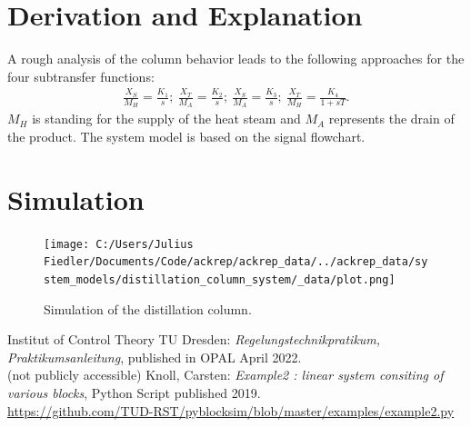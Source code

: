 \documentclass[10pt,a4paper]{article}
\begin{document}
	
	\section{Derivation and Explanation} %
	A rough analysis of the column behavior leads to the following approaches for the four subtransfer functions:
	\begin{align*}
		\frac{X_S}{M_H} = \frac{K_1}{s};\ \frac{X_T}{M_A} = \frac{K_2}{s};\ \frac{X_S}{M_A} = \frac{K_3}{s};\ \frac{X_T}{M_H} = \frac{K_4}{1 + sT}.
	\end{align*}
	$M_H$ is standing for the supply of the heat steam and $M_A$ represents the drain of the product. The system model is based on the signal flowchart.
	
	

\section{Simulation}
\begin{figure}[H]
\centering
\texttt{[image: C:/Users/Julius Fiedler/Documents/Code/ackrep/ackrep\_data/../ackrep\_data/system\_models/distillation\_column\_system/\_data/plot.png]}
\caption{Simulation of the distillation column.}
\end{figure}
	\begin{thebibliography}{10}		
		Institut of Control Theory TU Dresden: \textit{Regelungstechnikpratikum, Praktikumsanleitung}, published in OPAL April 2022. \\
		(not publicly accessible)
		Knoll, Carsten: \textit{Example2 : linear system consiting of various blocks}, Python Script published 2019. \\
		\url{https://github.com/TUD-RST/pyblocksim/blob/master/examples/example2.py}  
	\end{thebibliography}
\end{document}
